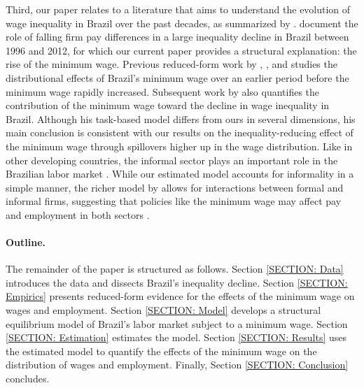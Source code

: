 Third, our paper relates to a literature that aims to understand the evolution of wage inequality in Brazil over the past decades, as summarized by \citet{FirpoPortella2019}. \citet{ABEM2018} document the role of falling firm pay differences in a large inequality decline in Brazil between 1996 and 2012, for which our current paper provides a structural explanation: the rise of the minimum wage. Previous reduced-form work by \citet{Fajnzylber2001}, \citet{NeumarkCunninghamSiga2006}, and \citet{Lemos2009} studies the distributional effects of Brazil's minimum wage over an earlier period before the minimum wage rapidly increased. Subsequent work by \citet{Haanwinckel2020} also quantifies the contribution of the minimum wage toward the decline in wage inequality in Brazil. Although his task-based model differs from ours in several dimensions, his main conclusion is consistent with our results on the inequality-reducing effect of the minimum wage through spillovers higher up in the wage distribution. Like in other developing countries, the informal sector plays an important role in the Brazilian labor market \citep{Ulyssea2018, Ulyssea2020, DixCarneiroGoldbergMeghirUlyssea2021}. While our estimated model accounts for informality in a simple manner, the richer model by \citet{MeghirNarita2015} allows for interactions between formal and informal firms, suggesting that policies like the minimum wage may affect pay and employment in both sectors \citep{Jales2018}.

\paragraph{Outline.}

The remainder of the paper is structured as follows. Section \ref{SECTION: Data} introduces the data and dissects Brazil's inequality decline. Section \ref{SECTION: Empirics} presents reduced-form evidence for the effects of the minimum wage on wages and employment. Section \ref{SECTION: Model} develops a structural equilibrium model of Brazil's labor market subject to a minimum wage. Section \ref{SECTION: Estimation} estimates the model. Section \ref{SECTION: Results} uses the estimated model to quantify the effects of the minimum wage on the distribution of wages and employment. Finally, Section \ref{SECTION: Conclusion} concludes.
